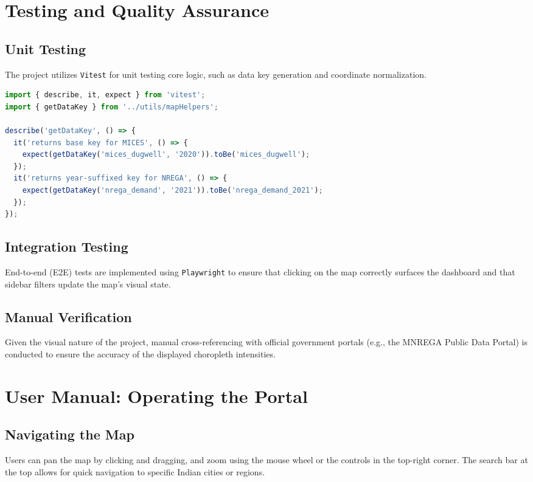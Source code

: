 \documentclass[12pt,a4paper]{report}
\begin{document}
\begin{spacing}{1.5}
\chapter{Testing and Quality Assurance}

\section{Unit Testing}
The project utilizes \texttt{Vitest} for unit testing core logic, such as data key generation and coordinate normalization.
\begin{lstlisting}[language=javascript, caption={Sample Unit Test for Data Key Generator}]
import { describe, it, expect } from 'vitest';
import { getDataKey } from '../utils/mapHelpers';

describe('getDataKey', () => {
  it('returns base key for MICES', () => {
    expect(getDataKey('mices_dugwell', '2020')).toBe('mices_dugwell');
  });
  it('returns year-suffixed key for NREGA', () => {
    expect(getDataKey('nrega_demand', '2021')).toBe('nrega_demand_2021');
  });
});
\end{lstlisting}

\section{Integration Testing}
End-to-end (E2E) tests are implemented using \texttt{Playwright} to ensure that clicking on the map correctly surfaces the dashboard and that sidebar filters update the map's visual state.

\section{Manual Verification}
Given the visual nature of the project, manual cross-referencing with official government portals (e.g., the MNREGA Public Data Portal) is conducted to ensure the accuracy of the displayed choropleth intensities.

\chapter{User Manual: Operating the Portal}

\section{Navigating the Map}
Users can pan the map by clicking and dragging, and zoom using the mouse wheel or the controls in the top-right corner. The search bar at the top allows for quick navigation to specific Indian cities or regions.


\end{spacing}
\end{document}
